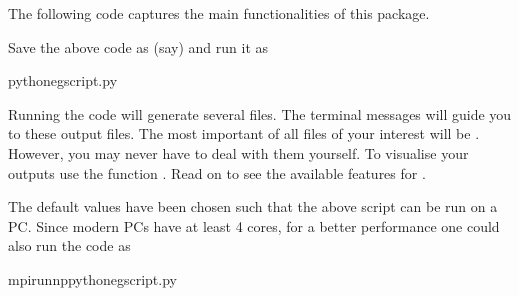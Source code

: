 \documentclass[letterpaper,10pt,english]{sphinxmanual}
\begin{document}
\sphinxAtStartPar
The following code captures the main functionalities of this package.

\begin{sphinxVerbatim}[commandchars=\\\{\}]
   

  



\end{sphinxVerbatim}

\sphinxAtStartPar
Save the above code as (say)  and run it as

\begin{sphinxVerbatim}[commandchars=\\\{\}]
pythoneg\PYGZus{}script.py
\end{sphinxVerbatim}

\sphinxAtStartPar
Running the code will generate several files. The terminal messages will
guide you to these output files. The most important of all files of your
interest will be . However, you may never have to deal
with them yourself. To visualise your outputs use the function
. Read on to see the available features for .

\sphinxAtStartPar
The default values have been chosen such that the above script can be
run on a PC. Since modern PCs have at least 4 cores, for a better
performance one could also run the code as

\begin{sphinxVerbatim}[commandchars=\\\{\}]
mpirun\PYGZhy{}nppythoneg\PYGZus{}script.py
\end{sphinxVerbatim}
\end{document}
